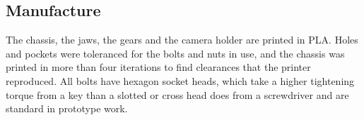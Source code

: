 \subsection{Manufacture}
\label{sec:manufacture}
The chassis, the jaws, the gears and the camera holder are printed in PLA. Holes and
pockets were toleranced for the bolts and nuts in use, and the chassis was printed in more
than four iterations to find clearances that the printer reproduced. All bolts have
hexagon socket heads, which take a higher tightening torque from a key than a slotted or
cross head does from a screwdriver and are standard in prototype work.
